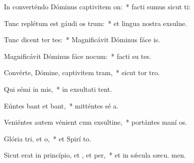 \item In converténdo Dóminus captivitem on:~* facti sumus sicut ti:
\item Tunc replétum est gáudi os trum:~* et lingua nostra exsulne.
\item Tunc dicent ter tes:~* Magnificávit Dóminus fáce  is.
\item Magnificávit Dóminus fáce nocum:~* facti su tes.
\item Convérte, Dómine, captivitem tram,~* sicut tor  tro.
\item Qui sémi in mis,~* in exsultati tent.
\item Eúntes bant et bant,~* mitténtes sé a.
\item Veniéntes autem vénient cum exsultine,~* portántes maní os.
\item Glória tri, et o,~* et Spirí to.
\item Sicut erat in princípio, et , et per,~* et in sǽcula sæcu. men.
